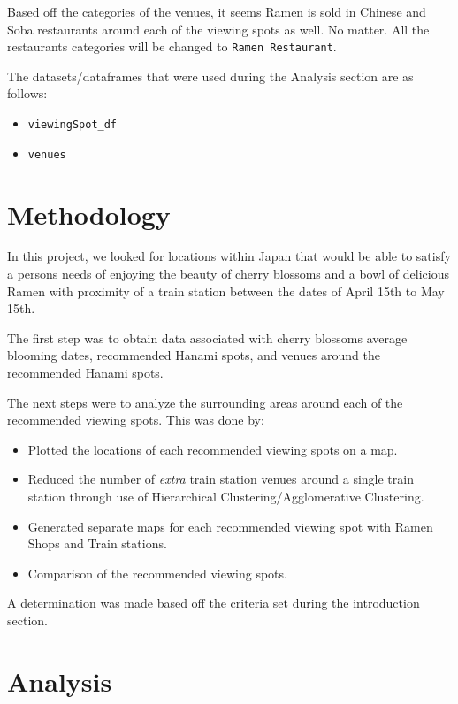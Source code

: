\documentclass[11pt]{article}
\providecommand{\tightlist}{%
      \setlength{\itemsep}{0pt}\setlength{\parskip}{0pt}}
\begin{document}
Based off the categories of the venues, it seems Ramen is sold in Chinese and Soba restaurants around each of the viewing spots as well.
No matter. All the restaurants categories will be changed to \texttt{Ramen\ Restaurant}.

The datasets/dataframes that were used during the Analysis section are as follows:

\begin{itemize}
\tightlist 
\item \texttt{viewingSpot\_df}
\item \texttt{venues}
\end{itemize}

    \hypertarget{methodology}{%
\section{Methodology}}\label{methodology}

In this project, we looked for locations within Japan that would be able to satisfy a persons needs of enjoying the beauty of
cherry blossoms and a bowl of delicious Ramen with proximity of a train station between the dates of April 15th to May 15th.

The first step was to obtain data associated with cherry blossoms average blooming dates, recommended Hanami spots, and venues around the
recommended Hanami spots.

The next steps were to analyze the surrounding areas around each of the recommended viewing spots. This was done by:

\begin{itemize}
\tightlist
\item Plotted the locations of each recommended viewing spots on a map.
\item Reduced the number of \emph{extra} train station venues around a single train
  station through use of Hierarchical Clustering/Agglomerative Clustering.
\item Generated separate maps for each recommended viewing spot with Ramen Shops and
  Train stations.
\item Comparison of the recommended viewing spots.
\end{itemize}

A determination was made based off the criteria set during the introduction section.

    \hypertarget{analysis}{%
\section{Analysis}}\label{analysis}
\end{document}
